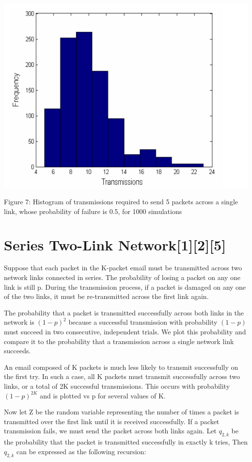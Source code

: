 \documentclass[10pt,twocolumn,letterpaper]{article}
\begin{document}
\includegraphics[width=\linewidth]{plots/fig7.PNG}
\caption{Figure 7: Histogram of transmissions required to send 5 packets across a single link, whose probability of failure is 0.5, for 1000 simulations}


\section*{Series Two-Link Network\small{[1][2][5]}}

Suppose that each packet in the K-packet email must be transmitted across two network links connected in series. The probability of losing a packet on any one link is still p. During the transmission process, if a packet is damaged on any one of the two links, it must be re-transmitted across the first link again.

The probability that a packet is transmitted successfully across both links in the network is $(1-p)^2$ because a successful transmission with probability $(1-p)$ must succeed in two consecutive, independent trials. We plot this probability and compare it to the probability that a transmission across a single network link succeeds. 

An email composed of K packets is much less likely to transmit successfully on the first try. In such a case, all K packets must transmit successfully across two links, or a total of 2K successful transmissions. This occurs with probability $(1-p)^{2K}$ and is plotted vs p for several values of K.

Now let Z be the random variable representing the number of times a packet is transmitted over the first link until it is received successfully. If a packet transmission fails, we must send the packet across both links again. Let $q_{2,k}$ be the probability that the packet is transmitted successfully in exactly k tries, Then $q_{2,k}$ can be expressed as the following recursion:
\end{document}
